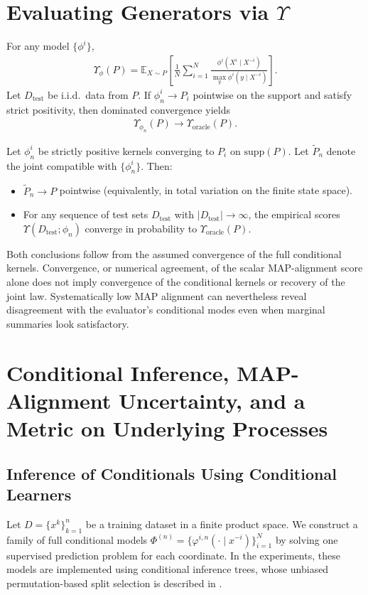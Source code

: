 \documentclass[runningheads]{llncs}
\def\EQSP{3pt}
\newcommand{\cgather}[2][\EQSP]{\begingroup\setlength\abovedisplayskip{#1}\setlength\belowdisplayskip{#1}\begin{gather} #2 \end{gather}\endgroup\noindent}
\begin{document}
\section{Evaluating Generators via \texorpdfstring{$\Upsilon$}{Upsilon}}
For any model $\{\phi^i\}$,
\cgather{
    \Upsilon_\phi(P)
    =
    \mathbb{E}_{X\sim P}
    \left[
        \frac{1}{N}\sum_{i=1}^N
        \frac{\phi^i(X^i\mid X^{-i})}
             {\max_y \phi^i(y\mid X^{-i})}
    \right].
}
Let $D_{\mathrm{test}}$ be i.i.d.\ data from $P$. If $\phi^i_n\to P_i$
pointwise on the support and satisfy strict positivity, then dominated
convergence yields
\cgather{
    \Upsilon_{\phi_n}(P)
    \to
    \Upsilon_{\mathrm{oracle}}(P).
}
\begin{corollary}
Let $\phi^i_n$ be strictly positive kernels converging to $P_i$ on
$\mathrm{supp}(P)$. Let $\widetilde P_n$ denote the joint compatible
with $\{\phi^i_n\}$. Then:
\begin{itemize}
\item $\widetilde P_n \to P$ pointwise (equivalently, in total variation on the finite state space).
\item For any sequence of test sets $D_{\mathrm{test}}$ with
      $|D_{\mathrm{test}}|\to\infty$, the empirical scores
      $\Upsilon(D_{\mathrm{test}};\phi_n)$ converge in probability to
      $\Upsilon_{\mathrm{oracle}}(P)$.
\end{itemize}
Both conclusions follow from the assumed convergence of the full conditional
kernels. Convergence, or numerical agreement, of the scalar MAP-alignment score
alone does not imply convergence of the conditional kernels or recovery of the
joint law. Systematically low MAP alignment can nevertheless reveal disagreement
with the evaluator's conditional modes even when marginal summaries look
satisfactory.
\end{corollary}

\section{Conditional Inference, MAP-Alignment Uncertainty, and a Metric on Underlying Processes}

\subsection{Inference of Conditionals Using Conditional Learners}

Let $D=\{x^k\}_{k=1}^n$ be a training dataset in a finite product space. We
construct a family of full conditional models
$\Phi^{(n)}=\{\varphi^{i,n}(\cdot\mid x^{-i})\}_{i=1}^N$ by solving one
supervised prediction problem for each coordinate. In the experiments, these
models are implemented using conditional inference trees, whose unbiased
permutation-based split selection is described in
\cite{hothorn2006,hothorn2006party,strobl2007}.
\end{document}
